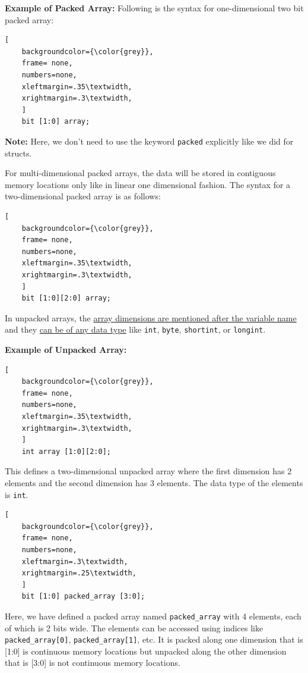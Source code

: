 \documentclass[12pt, a4paper]{article}
\begin{document}
\vspace{1em}

\textbf{Example of Packed Array:} 
Following is the syntax for one-dimensional two bit packed array:
\begin{lstlisting}[
    backgroundcolor={\color{grey}},
    frame= none,
    numbers=none,
    xleftmargin=.35\textwidth,
    xrightmargin=.3\textwidth, 
    ]
    bit [1:0] array;
\end{lstlisting}

\textbf{Note:} Here, we don't need to use the keyword \texttt{packed} explicitly like we did for structs.

\vspace{0.5em}
For multi-dimensional packed arrays, the data will be stored in contiguous memory locations only like in linear one dimensional fashion. The syntax for a two-dimensional packed array is as follows:

\begin{lstlisting}[
    backgroundcolor={\color{grey}},
    frame= none,
    numbers=none,
    xleftmargin=.35\textwidth,
    xrightmargin=.3\textwidth, 
    ]
    bit [1:0][2:0] array;
\end{lstlisting}

In unpacked arrays, the \ul{ array dimensions are mentioned after the variable name} and they \ul{can be of any data type} like \texttt{int}, \texttt{byte}, \texttt{shortint}, or \texttt{longint}.

\vspace{1em}

\textbf{Example of Unpacked Array:}
\begin{lstlisting}[
    backgroundcolor={\color{grey}},
    frame= none,
    numbers=none,
    xleftmargin=.35\textwidth,
    xrightmargin=.3\textwidth, 
    ]
    int array [1:0][2:0]; 
\end{lstlisting}

This defines a two-dimensional unpacked array where the first dimension has 2 elements and the second dimension has 3 elements. The data type of the elements is \texttt{int}.

\begin{lstlisting}[
    backgroundcolor={\color{grey}},
    frame= none,
    numbers=none,
    xleftmargin=.3\textwidth,
    xrightmargin=.25\textwidth, 
    ]
    bit [1:0] packed_array [3:0];
\end{lstlisting}

Here, we have defined a packed array named \texttt{packed\_array} with 4 elements, each of which is 2 bits wide. The elements can be accessed using indices like \texttt{packed\_array[0]}, \texttt{packed\_array[1]}, etc. It is packed along one dimension that is [1:0] is continuous memory locations but unpacked along the other dimension that is [3:0] is not continuous memory locations.
\end{document}
